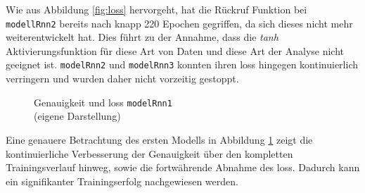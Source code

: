 \documentclass[
    12pt, %
    DIV10,
    ngerman, %
    a4paper, %
    oneside, %
    titlepage, %
    parskip=half, %
    headings=normal, %
    listof=totoc, %
    bibliography=totoc, %
    index=totoc, %
    captions=tableheading, %
    final %
]{scrreprt}
\begin{document}
Wie aus Abbildung \ref{fig:loss} hervorgeht, hat die Rückruf Funktion bei \texttt{modellRnn2} bereits nach knapp 220 Epochen gegriffen, da sich dieses nicht mehr weiterentwickelt hat. Dies führt zu der Annahme, dass die \emph{tanh} Aktivierungsfunktion für diese Art von Daten und diese Art der Analyse nicht geeignet ist. \texttt{modelRnn2} und \texttt{modelRnn3} konnten ihren loss hingegen kontinuierlich verringern und wurden daher nicht vorzeitig gestoppt.

\begin{figure}[H]
\caption{Genauigkeit und loss \texttt{modelRnn1}\\(eigene Darstellung)}\label{fig:rnn1}
\end{figure}
Eine genauere Betrachtung des ersten Modells in Abbildung \ref{fig:rnn1} zeigt die kontinuierliche Verbesserung der Genauigkeit über den kompletten Trainingsverlauf hinweg, sowie die fortwährende Abnahme des loss. Dadurch kann ein signifikanter Trainingserfolg nachgewiesen werden.
\end{document}
